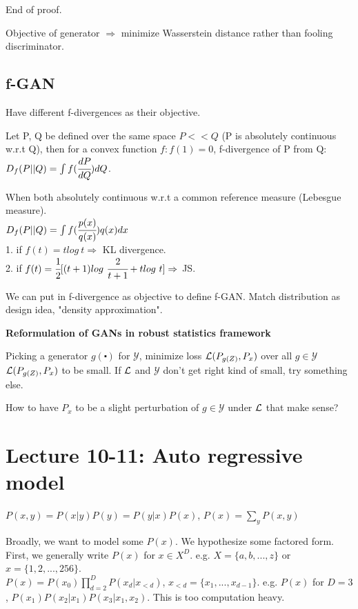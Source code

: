 \documentclass[12pt,a4paper]{article}
\begin{document}
End of proof. 

\vspace{0.5cm}
Objective of generator $\Rightarrow$ minimize Wasserstein distance rather than fooling discriminator. 

\subsection{f-GAN}
Have different f-divergences as their objective. 

Let P, Q be defined over the same space $P<<Q$ (P is absolutely continuous w.r.t Q), then for a convex function $f: f(1)=0$, f-divergence of P from Q:\\
$D_f(P||Q)=\int f(\cfrac{dP}{dQ})dQ$. 

When both absolutely continuous w.r.t a common reference measure (Lebesgue measure).\\
$D_f(P||Q)=\int f(\cfrac{p(x)}{q(x)})q(x)dx$ \\
1. if $f(t)=tlog\ t\Rightarrow$ KL divergence.\\
2. if $f(t)=\cfrac{1}{2} [(t+1)log\ \cfrac{2}{t+1}+tlog\ t]\Rightarrow$ JS. 

We can put in f-divergence as objective to define f-GAN. Match distribution as design idea, "density approximation".

\vspace{0.5cm}
\textbf{Reformulation of GANs in robust statistics framework}

Picking a generator $g(\centerdot)$ for $\mathcal{Y}$, minimize loss $\mathcal{L}(P_{g(Z)}, P_x)$ over all $g\in \mathcal{Y}$\\
$\mathcal{L}(P_{g(Z)},P_x)$ to be small. If $\mathcal{L}$ and $\mathcal{Y}$ don't get right kind of small, try something else. 

How to have $P_x$ to be a slight perturbation of $g\in \mathcal{Y}$ under $\mathcal{L}$ that make sense?

\section{Lecture 10-11: Auto regressive model}

$P(x,y)=P(x|y)P(y)=P(y|x)P(x)$, $P(x)=\sum_yP(x,y)$ 

Broadly, we want to model some $P(x)$. We hypothesize some factored form. \\
First, we generally write $P(x)$ for $x\in X^D$. e.g. $X=\{a,b,...,z\}$ or $x=\{1,2,...,256\}$.\\
$P(x)=P(x_0)\prod_{d=2}^D P(x_d|x_{<d})$, $x_{<d}=\{x_1,...,x_{d-1}\}$. e.g. $P(x)$ for $D=3$, $P(x_1)P(x_2|x_1)P(x_3|x_1,x_2)$. This is too computation heavy. 
\end{document}
